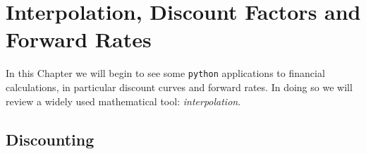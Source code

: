 \chapter{Interpolation, Discount Factors and Forward Rates}
\label{interpolation}

In this Chapter we will begin to see some \texttt{python} applications to financial calculations, in particular discount curves and forward rates. In doing so we will review a widely used mathematical tool: \emph{interpolation}.

\section{Discounting}
\label{discount-factors}

%
%
%
%
%
%
%
